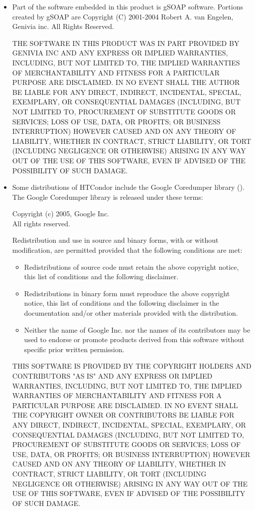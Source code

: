 \begin{itemize}
\item
Part of the software embedded in this product is gSOAP software.
Portions created by gSOAP are Copyright (C) 2001-2004 Robert A. van Engelen, Genivia inc. All Rights Reserved.

THE SOFTWARE IN THIS PRODUCT WAS IN PART PROVIDED BY GENIVIA INC AND ANY EXPRESS OR IMPLIED WARRANTIES, INCLUDING, BUT NOT LIMITED TO, THE IMPLIED WARRANTIES OF MERCHANTABILITY AND FITNESS FOR A PARTICULAR PURPOSE ARE DISCLAIMED. IN NO EVENT SHALL THE AUTHOR BE LIABLE FOR ANY DIRECT, INDIRECT, INCIDENTAL, SPECIAL, EXEMPLARY, OR CONSEQUENTIAL DAMAGES (INCLUDING, BUT NOT LIMITED TO, PROCUREMENT OF SUBSTITUTE GOODS OR SERVICES; LOSS OF USE, DATA, OR PROFITS; OR BUSINESS INTERRUPTION) HOWEVER CAUSED AND ON ANY THEORY OF LIABILITY, WHETHER IN CONTRACT, STRICT LIABILITY, OR TORT (INCLUDING NEGLIGENCE OR OTHERWISE) ARISING IN ANY WAY OUT OF THE USE OF THIS SOFTWARE, EVEN IF ADVISED OF THE POSSIBILITY OF SUCH DAMAGE.

\item
Some distributions of HTCondor include the Google Coredumper library
().  The Google Coredumper
library is released under these terms:

Copyright (c) 2005, Google Inc. \\
All rights reserved.

Redistribution and use in source and binary forms, with or without
modification, are permitted provided that the following conditions are
met:

	\begin{itemize}
    \item Redistributions of source code must retain the above copyright
notice, this list of conditions and the following disclaimer.

    \item Redistributions in binary form must reproduce the above
copyright notice, this list of conditions and the following disclaimer
in the documentation and/or other materials provided with the
distribution.

    \item Neither the name of Google Inc. nor the names of its
contributors may be used to endorse or promote products derived from
this software without specific prior written permission.
	\end{itemize}

THIS SOFTWARE IS PROVIDED BY THE COPYRIGHT HOLDERS AND CONTRIBUTORS
"AS IS" AND ANY EXPRESS OR IMPLIED WARRANTIES, INCLUDING, BUT NOT
LIMITED TO, THE IMPLIED WARRANTIES OF MERCHANTABILITY AND FITNESS FOR
A PARTICULAR PURPOSE ARE DISCLAIMED. IN NO EVENT SHALL THE COPYRIGHT
OWNER OR CONTRIBUTORS BE LIABLE FOR ANY DIRECT, INDIRECT, INCIDENTAL,
SPECIAL, EXEMPLARY, OR CONSEQUENTIAL DAMAGES (INCLUDING, BUT NOT
LIMITED TO, PROCUREMENT OF SUBSTITUTE GOODS OR SERVICES; LOSS OF USE,
DATA, OR PROFITS; OR BUSINESS INTERRUPTION) HOWEVER CAUSED AND ON ANY
THEORY OF LIABILITY, WHETHER IN CONTRACT, STRICT LIABILITY, OR TORT
(INCLUDING NEGLIGENCE OR OTHERWISE) ARISING IN ANY WAY OUT OF THE USE
OF THIS SOFTWARE, EVEN IF ADVISED OF THE POSSIBILITY OF SUCH DAMAGE.


\end{itemize}
